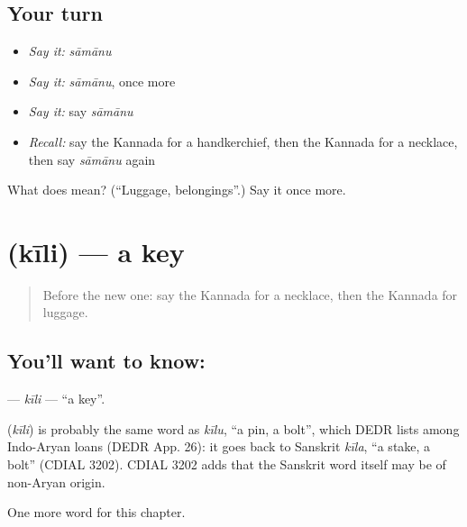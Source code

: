 \subsection*{Your turn}
\begin{itemize}
\raggedright
  \item \emph{Say it:} \emph{sāmānu}
  \item \emph{Say it:} \emph{sāmānu}, once more
  \item \emph{Say it:} say \emph{sāmānu}
  \item \emph{Recall:} say the Kannada for a handkerchief, then the Kannada for a necklace, then say \emph{sāmānu} again
\end{itemize}

\begin{tcolorbox}[breakable,colback=teal!4,colframe=teal!35!black,title={Before you move on}]
What does  mean? (\textquotedblleft{}Luggage, belongings\textquotedblright{}.) Say it once more.
\end{tcolorbox}
\section[\texorpdfstring{\kn{ಕೀಲಿ} (kīli)}{ಕೀಲಿ (kīli)}]{ (kīli) — a key}

\label{lesson:KA-C260-kili}



\begin{quote}
Before the new one: say the Kannada for a necklace, then the Kannada for luggage.
\end{quote}

\subsection*{You'll want to know: }
\textbf{} — \emph{kīli} — \textquotedblleft{}a key\textquotedblright{}.

\begin{cousinweb}
\textbf{} (\emph{kīli}) is probably the same word as \emph{kīlu}, \textquotedblleft{}a pin, a bolt\textquotedblright{}, which DEDR lists among Indo-Aryan loans (DEDR App. 26): it goes back to Sanskrit \emph{kīla}, \textquotedblleft{}a stake, a bolt\textquotedblright{} (CDIAL 3202). CDIAL 3202 adds that the Sanskrit word itself may be of non-Aryan origin.
\end{cousinweb}

\begin{grammarlens}[title={What you've built}]
One more word for this chapter.
\end{grammarlens}

